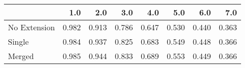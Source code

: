 \begin{tabular}{lrrrrrrr}
\toprule
{} &   1.0 &   2.0 &   3.0 &   4.0 &   5.0 &   6.0 &   7.0 \\
\midrule
No Extension & 0.982 & 0.913 & 0.786 & 0.647 & 0.530 & 0.440 & 0.363 \\
Single       & 0.984 & 0.937 & 0.825 & 0.683 & 0.549 & 0.448 & 0.366 \\
Merged       & 0.985 & 0.944 & 0.833 & 0.689 & 0.553 & 0.449 & 0.366 \\
\bottomrule
\end{tabular}
